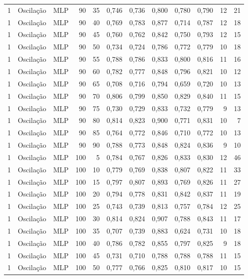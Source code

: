 \begin{longtable}{@{}rllrrrrrrrrr@{}}
1 & Oscilação & MLP & 90 & 35 & 0,746 & 0,736 & 0,800 & 0,780 & 0,790 & 12 & 21 \\
1 & Oscilação & MLP & 90 & 40 & 0,769 & 0,783 & 0,877 & 0,714 & 0,787 & 12 & 18 \\
1 & Oscilação & MLP & 90 & 45 & 0,760 & 0,762 & 0,842 & 0,750 & 0,793 & 12 & 15 \\
1 & Oscilação & MLP & 90 & 50 & 0,734 & 0,724 & 0,786 & 0,772 & 0,779 & 10 & 18 \\
1 & Oscilação & MLP & 90 & 55 & 0,788 & 0,786 & 0,833 & 0,800 & 0,816 & 11 & 16 \\
1 & Oscilação & MLP & 90 & 60 & 0,782 & 0,777 & 0,848 & 0,796 & 0,821 & 10 & 12 \\
1 & Oscilação & MLP & 90 & 65 & 0,708 & 0,716 & 0,794 & 0,659 & 0,720 & 10 & 13 \\
1 & Oscilação & MLP & 90 & 70 & 0,806 & 0,799 & 0,850 & 0,829 & 0,840 & 11 & 15 \\
1 & Oscilação & MLP & 90 & 75 & 0,730 & 0,729 & 0,833 & 0,732 & 0,779 & 9 & 13 \\
1 & Oscilação & MLP & 90 & 80 & 0,814 & 0,823 & 0,900 & 0,771 & 0,831 & 10 & 7 \\
1 & Oscilação & MLP & 90 & 85 & 0,764 & 0,772 & 0,846 & 0,710 & 0,772 & 10 & 13 \\
1 & Oscilação & MLP & 90 & 90 & 0,788 & 0,773 & 0,848 & 0,824 & 0,836 & 9 & 10 \\
1 & Oscilação & MLP & 100 & 5 & 0,784 & 0,767 & 0,826 & 0,833 & 0,830 & 12 & 46 \\
1 & Oscilação & MLP & 100 & 10 & 0,779 & 0,769 & 0,838 & 0,807 & 0,822 & 11 & 33 \\
1 & Oscilação & MLP & 100 & 15 & 0,797 & 0,807 & 0,893 & 0,769 & 0,826 & 11 & 27 \\
1 & Oscilação & MLP & 100 & 20 & 0,794 & 0,778 & 0,831 & 0,842 & 0,837 & 11 & 19 \\
1 & Oscilação & MLP & 100 & 25 & 0,743 & 0,739 & 0,813 & 0,757 & 0,784 & 12 & 25 \\
1 & Oscilação & MLP & 100 & 30 & 0,814 & 0,824 & 0,907 & 0,788 & 0,843 & 11 & 17 \\
1 & Oscilação & MLP & 100 & 35 & 0,707 & 0,739 & 0,883 & 0,624 & 0,731 & 10 & 18 \\
1 & Oscilação & MLP & 100 & 40 & 0,786 & 0,782 & 0,855 & 0,797 & 0,825 & 9 & 18 \\
1 & Oscilação & MLP & 100 & 45 & 0,731 & 0,710 & 0,788 & 0,788 & 0,788 & 11 & 15 \\
1 & Oscilação & MLP & 100 & 50 & 0,777 & 0,766 & 0,825 & 0,810 & 0,817 & 10 & 15 \\

\end{longtable}
